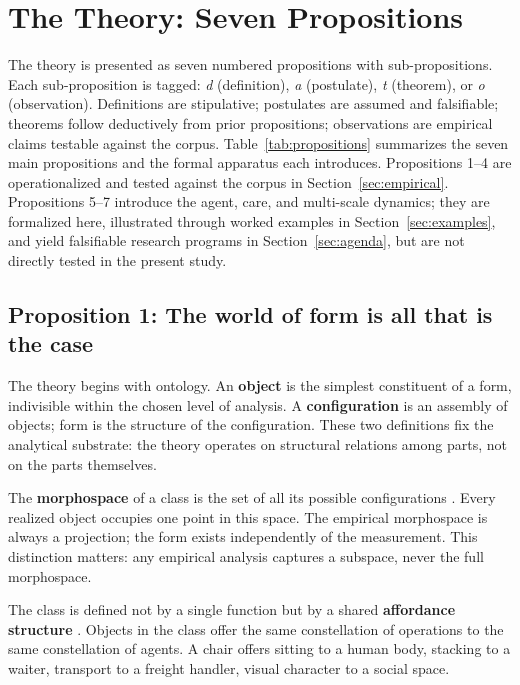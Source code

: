 \section{The Theory: Seven Propositions}
\label{sec:theory}

The theory is presented as seven numbered propositions with sub-propositions. Each sub-proposition is tagged: \textit{d} (definition), \textit{a} (postulate), \textit{t} (theorem), or \textit{o} (observation). Definitions are stipulative; postulates are assumed and falsifiable; theorems follow deductively from prior propositions; observations are empirical claims testable against the corpus. Table~\ref{tab:propositions} summarizes the seven main propositions and the formal apparatus each introduces. Propositions 1--4 are operationalized and tested against the corpus in Section~\ref{sec:empirical}. Propositions 5--7 introduce the agent, care, and multi-scale dynamics; they are formalized here, illustrated through worked examples in Section~\ref{sec:examples}, and yield falsifiable research programs in Section~\ref{sec:agenda}, but are not directly tested in the present study.

\subsection{Proposition 1: The world of form is all that is the case}
\label{sec:prop1}

The theory begins with ontology. An \textbf{object} is the simplest constituent of a form, indivisible within the chosen level of analysis. A \textbf{configuration} is an assembly of objects; form is the structure of the configuration. These two definitions fix the analytical substrate: the theory operates on structural relations among parts, not on the parts themselves.

The \textbf{morphospace} of a class is the set of all its possible configurations \parencite{Raup1966, Mitteroecker2009}. Every realized object occupies one point in this space. The empirical morphospace is always a projection; the form exists independently of the measurement. This distinction matters: any empirical analysis captures a subspace, never the full morphospace.

The class is defined not by a single function but by a shared \textbf{affordance structure} \parencite{Gibson1979}. Objects in the class offer the same constellation of operations to the same constellation of agents. A chair offers sitting to a human body, stacking to a waiter, transport to a freight handler, visual character to a social space.

